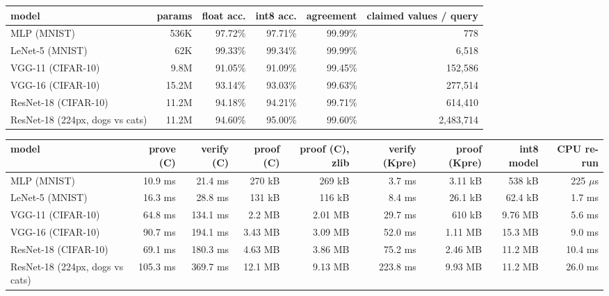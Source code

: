 \begin{tabular}{lrrrrr}
\toprule
model & params & float acc. & int8 acc. & agreement & claimed values / query \\
\midrule
MLP (MNIST) & 536K & 97.72\% & 97.71\% & 99.99\% & 778 \\
LeNet-5 (MNIST) & 62K & 99.33\% & 99.34\% & 99.99\% & 6,518 \\
VGG-11 (CIFAR-10) & 9.8M & 91.05\% & 91.09\% & 99.45\% & 152,586 \\
VGG-16 (CIFAR-10) & 15.2M & 93.14\% & 93.03\% & 99.63\% & 277,514 \\
ResNet-18 (CIFAR-10) & 11.2M & 94.18\% & 94.21\% & 99.71\% & 614,410 \\
ResNet-18 (224px, dogs vs cats) & 11.2M & 94.60\% & 95.00\% & 99.60\% & 2,483,714 \\
\bottomrule
\end{tabular}

\begin{tabular}{lrrrrrrrr}
\toprule
model & prove (C) & verify (C) & proof (C) & proof (C), zlib & verify (Kpre) & proof (Kpre) & int8 model & CPU re-run \\
\midrule
MLP (MNIST) & 10.9 ms & 21.4 ms & 270 kB & 269 kB & 3.7 ms & 3.11 kB & 538 kB & 225 $\mu$s \\
LeNet-5 (MNIST) & 16.3 ms & 28.8 ms & 131 kB & 116 kB & 8.4 ms & 26.1 kB & 62.4 kB & 1.7 ms \\
VGG-11 (CIFAR-10) & 64.8 ms & 134.1 ms & 2.2 MB & 2.01 MB & 29.7 ms & 610 kB & 9.76 MB & 5.6 ms \\
VGG-16 (CIFAR-10) & 90.7 ms & 194.1 ms & 3.43 MB & 3.09 MB & 52.0 ms & 1.11 MB & 15.3 MB & 9.0 ms \\
ResNet-18 (CIFAR-10) & 69.1 ms & 180.3 ms & 4.63 MB & 3.86 MB & 75.2 ms & 2.46 MB & 11.2 MB & 10.4 ms \\
ResNet-18 (224px, dogs vs cats) & 105.3 ms & 369.7 ms & 12.1 MB & 9.13 MB & 223.8 ms & 9.93 MB & 11.2 MB & 26.0 ms \\
\bottomrule
\end{tabular}

